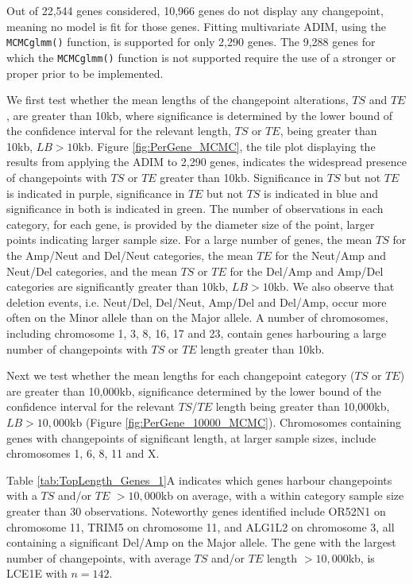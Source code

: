 Out of 22,544 genes considered, 10,966 genes do not display any changepoint, meaning no model is fit for those genes. Fitting multivariate ADIM, using the \texttt{MCMCglmm()} function, is supported for only 2,290 genes. The 9,288 genes for which the \texttt{MCMCglmm()} function is not supported require the use of a stronger or proper prior to be implemented. 

We first test whether the mean lengths of the changepoint alterations, $TS$ and $TE$, are greater than 10kb, where significance is determined by the lower bound of the confidence interval for the relevant length, $TS$ or $TE$, being greater than 10kb, $LB > 10$kb. Figure \ref{fig:PerGene_MCMC}, the tile plot displaying the results from applying the ADIM to 2,290 genes, indicates the widespread presence of changepoints with $TS$ or $TE$ greater than 10kb. Significance in $TS$ but not $TE$ is indicated in purple, significance in $TE$ but not $TS$ is indicated in blue and significance in both is indicated in green. The number of observations in each category, for each gene, is provided by the diameter size of the point, larger points indicating larger sample size. For a large number of genes, the mean $TS$ for the Amp/Neut and Del/Neut categories, the mean $TE$ for the Neut/Amp and Neut/Del categories, and the mean $TS$ or $TE$ for the Del/Amp and Amp/Del categories are significantly greater than 10kb, $LB > 10$kb. We also observe that deletion events, i.e. Neut/Del, Del/Neut, Amp/Del and Del/Amp, occur more often on the Minor allele than on the Major allele. A number of chromosomes, including chromosome 1, 3, 8, 16, 17 and 23, contain genes harbouring a large number of changepoints with $TS$ or $TE$ length greater than 10kb.

Next we test whether the mean lengths for each changepoint category ($TS$ or $TE$) are greater than 10,000kb, significance determined by the lower bound of the confidence interval for the relevant $TS$/$TE$ length being greater than 10,000kb, $LB > 10,000$kb (Figure \ref{fig:PerGene_10000_MCMC}). Chromosomes containing genes with changepoints of significant length, at larger sample sizes, include chromosomes 1, 6, 8, 11 and X.

Table \ref{tab:TopLength_Genes_1}A indicates which genes harbour changepoints with a $TS$ and/or $TE$ $>10,000$kb on average, with a within category sample size greater than 30 observations. Noteworthy genes identified include OR52N1 on chromosome 11, TRIM5 on chromosome 11, and ALG1L2 on chromosome 3, all containing a significant Del/Amp on the Major allele. The gene with the largest number of changepoints, with average $TS$ and/or $TE$ length $>10,000$kb, is LCE1E with $n = 142$. 

